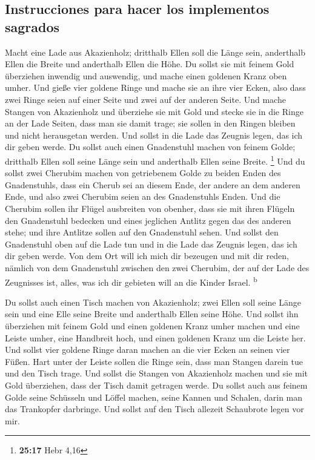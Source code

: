 \hypertarget{instrucciones-para-hacer-los-implementos-sagrados}{%
\subsection{Instrucciones para hacer los implementos
sagrados}\label{instrucciones-para-hacer-los-implementos-sagrados}}

 Macht eine Lade aus Akazienholz; dritthalb Ellen soll
die Länge sein, anderthalb Ellen die Breite und anderthalb Ellen die
Höhe.  Du sollst sie mit feinem Gold überziehen inwendig
und auswendig, und mache einen goldenen Kranz oben umher.
 Und gieße vier goldene Ringe und mache sie an ihre vier
Ecken, also dass zwei Ringe seien auf einer Seite und zwei auf der
anderen Seite.  Und mache Stangen von Akazienholz und
überziehe sie mit Gold  und stecke sie in die Ringe an
der Lade Seiten, dass man sie damit trage;  sie sollen in
den Ringen bleiben und nicht herausgetan werden.  Und
sollst in die Lade das Zeugnis legen, das ich dir geben werde.
 Du sollst auch einen Gnadenstuhl machen von feinem
Golde; dritthalb Ellen soll seine Länge sein und anderthalb Ellen seine
Breite. \footnote{\textbf{25:17} Hebr 4,16}  Und du
sollst zwei Cherubim machen von getriebenem Golde zu beiden Enden des
Gnadenstuhls,  dass ein Cherub sei an diesem Ende, der
andere an dem anderen Ende, und also zwei Cherubim seien an des
Gnadenstuhls Enden.  Und die Cherubim sollen ihr Flügel
ausbreiten von obenher, dass sie mit ihren Flügeln den Gnadenstuhl
bedecken und eines jeglichen Antlitz gegen das des anderen stehe; und
ihre Antlitze sollen auf den Gnadenstuhl sehen.  Und
sollst den Gnadenstuhl oben auf die Lade tun und in die Lade das Zeugnis
legen, das ich dir geben werde.  Von dem Ort will ich
mich dir bezeugen und mit dir reden, nämlich von dem Gnadenstuhl
zwischen den zwei Cherubim, der auf der Lade des Zeugnisses ist, alles,
was ich dir gebieten will an die Kinder Israel. \textsuperscript{b}

 Du sollst auch einen Tisch machen von Akazienholz; zwei
Ellen soll seine Länge sein und eine Elle seine Breite und anderthalb
Ellen seine Höhe.  Und sollst ihn überziehen mit feinem
Gold und einen goldenen Kranz umher machen  und eine
Leiste umher, eine Handbreit hoch, und einen goldenen Kranz um die
Leiste her.  Und sollst vier goldene Ringe daran machen
an die vier Ecken an seinen vier Füßen.  Hart unter der
Leiste sollen die Ringe sein, dass man Stangen darein tue und den Tisch
trage.  Und sollst die Stangen von Akazienholz machen und
sie mit Gold überziehen, dass der Tisch damit getragen werde.
 Du sollst auch aus feinem Golde seine Schüsseln und
Löffel machen, seine Kannen und Schalen, darin man das Trankopfer
darbringe.  Und sollst auf den Tisch allezeit Schaubrote
legen vor mir.

